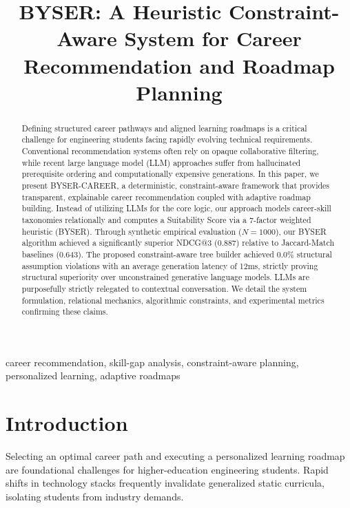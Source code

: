 \documentclass[conference]{IEEEtran}
\begin{document}
\title{BYSER: A Heuristic Constraint-Aware System for Career Recommendation and Roadmap Planning}

\author{
}

\maketitle

\begin{abstract}
Defining structured career pathways and aligned learning roadmaps is a critical challenge for engineering students facing rapidly evolving technical requirements. Conventional recommendation systems often rely on opaque collaborative filtering, while recent large language model (LLM) approaches suffer from hallucinated prerequisite ordering and computationally expensive generations. In this paper, we present BYSER-CAREER, a deterministic, constraint-aware framework that provides transparent, explainable career recommendation coupled with adaptive roadmap building. Instead of utilizing LLMs for the core logic, our approach models career-skill taxonomies relationally and computes a Suitability Score via a 7-factor weighted heuristic (BYSER). Through synthetic empirical evaluation ($N=1000$), our BYSER algorithm achieved a significantly superior NDCG@3 (0.887) relative to Jaccard-Match baselines (0.643). The proposed constraint-aware tree builder achieved 0.0\% structural assumption violations with an average generation latency of 12ms, strictly proving structural superiority over unconstrained generative language models. LLMs are purposefully strictly relegated to contextual conversation. We detail the system formulation, relational mechanics, algorithmic constraints, and experimental metrics confirming these claims.
\end{abstract}

\begin{IEEEkeywords}
career recommendation, skill-gap analysis, constraint-aware planning, personalized learning, adaptive roadmaps
\end{IEEEkeywords}

\section{Introduction}
Selecting an optimal career path and executing a personalized learning roadmap are foundational challenges for higher-education engineering students. Rapid shifts in technology stacks frequently invalidate generalized static curricula, isolating students from industry demands.
\end{document}
